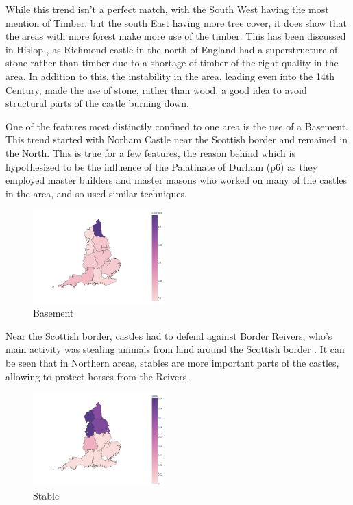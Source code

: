 \documentclass[11pt]{article}
\begin{document}
While this trend isn't a perfect match, with the South West having the most mention of Timber, but the south East having more tree cover, it does show that the areas with more forest make more use of the timber. This has been discussed in Hislop \cite{HislopMalcolm2016Cb:a}, as Richmond castle in the north of England had a superstructure of stone rather than timber due to a shortage of timber of the right quality in the area. In addition to this, the instability in the area, leading even into the 14th Century, made the use of stone, rather than wood, a good idea to avoid structural parts of the castle burning down.

One of the features most distinctly confined to one area is the use of a Basement. This trend started with Norham Castle near the Scottish border \cite{HislopMalcolm2016Cb:a} and remained in the North. This is true for a few features, the reason behind which is hypothesized to be the influence of the Palatinate of Durham \cite{HislopMalcolm2016Cb:a}(p6) as they employed master builders and master masons who worked on many of the castles in the area, and so used similar techniques.

\begin{figure}[H]
	\centering
	\includegraphics[width=0.45\textwidth]{basement.png}
	\caption{Basement}
\end{figure}



Near the Scottish border, castles had to defend against Border Reivers, who's main activity was stealing animals from land around the Scottish border \cite{moffat2011reivers}. It can be seen that in Northern areas, stables are more important parts of the castles, allowing to protect horses from the Reivers.

\begin{figure}[H]
	\centering
	\includegraphics[width=0.45\textwidth]{stable.png}
	\caption{Stable}
\end{figure}
\end{document}
